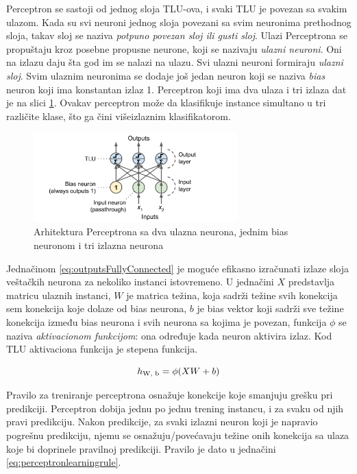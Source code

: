 \documentclass[a4paper,12pt]{report}
\begin{document}
Perceptron se sastoji od jednog sloja TLU-ova, i svaki TLU je povezan sa svakim ulazom. Kada su svi neuroni jednog sloja povezani sa svim neuronima prethodnog sloja, takav sloj se naziva \textit{potpuno povezan sloj ili gusti sloj}. Ulazi Perceptrona se propuštaju kroz posebne propusne neurone, koji se nazivaju \textit{ulazni neuroni}. Oni na izlazu daju šta god im se nalazi na ulazu. Svi ulazni neuroni formiraju \textit{ulazni sloj}. Svim ulaznim neuronima se dodaje još jedan neuron  koji se naziva \textit{bias} neuron koji ima konstantan izlaz 1. Perceptron koji ima dva ulaza i tri izlaza dat je na slici \ref{fig:perceptron2i3o}. Ovakav perceptron može da klasifikuje instance simultano u tri različite klase, što ga čini višeizlaznim klasifikatorom. 

\begin{figure}[h]
    \centering
    \includegraphics[width=0.7\textwidth]{perceptron_2_i_3_o.png}
    \caption{Arhitektura Perceptrona sa dva ulazna neurona, jednim bias neuronom i tri izlazna neurona}\label{fig:perceptron2i3o}
\end{figure}

Jednačinom \eqref{eq:outputsFullyConnected} je moguće efikasno izračunati izlaze sloja veštačkih neurona za nekoliko instanci istovremeno. U jednačini $X$ predstavlja matricu ulaznih instanci, $W$ je matrica težina, koja sadrži težine svih konekcija sem konekcija koje dolaze od bias neurona, $b$ je bias vektor koji sadrži sve težine konekcija između bias neurona i svih neurona sa kojima je povezan, funkcija $\phi$ se naziva \textit{aktivacionom funkcijom}: ona određuje kada neuron aktivira izlaz. Kod TLU aktivaciona funkcija je stepena funkcija. 

\begin{equation}\label{eq:outputsFullyConnected}
h\textsubscript{W, b} = \phi (XW + b)
\end{equation}

Pravilo za treniranje perceptrona osnažuje konekcije koje smanjuju grešku pri predikciji. Perceptron dobija jednu po jednu trening instancu, i za svaku od njih pravi predikciju. Nakon predikcije, za svaki izlazni neuron koji je napravio pogrešnu predikciju, njemu se osnažuju/povećavaju težine onih konekcija sa ulaza koje bi doprinele pravilnoj predikciji. Pravilo je dato u jednačini \eqref{eq:perceptronlearningrule}.
\end{document}
